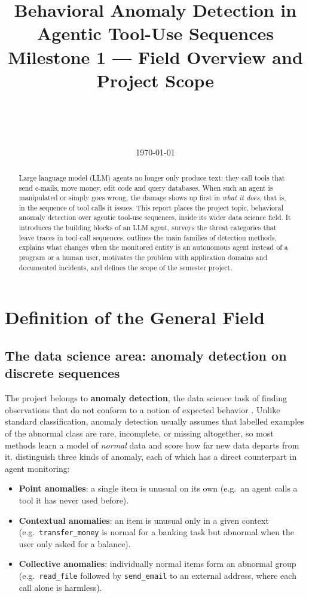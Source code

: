 \documentclass[11pt,a4paper]{article}
\title{\textbf{Behavioral Anomaly Detection in Agentic Tool-Use Sequences}\\[4pt]
\large Milestone 1 --- Field Overview and Project Scope}
\author{\studentname\\ \small \studentid\\ \small \supervisor\\ \small \course}
\date{\today}
\begin{document}
\maketitle

\begin{abstract}
\noindent Large language model (LLM) agents no longer only produce text: they call tools that send e-mails, move money, edit code and query databases. When such an agent is manipulated or simply goes wrong, the damage shows up first in \emph{what it does}, that is, in the sequence of tool calls it issues. This report places the project topic, behavioral anomaly detection over agentic tool-use sequences, inside its wider data science field. It introduces the building blocks of an LLM agent, surveys the threat categories that leave traces in tool-call sequences, outlines the main families of detection methods, explains what changes when the monitored entity is an autonomous agent instead of a program or a human user, motivates the problem with application domains and documented incidents, and defines the scope of the semester project.
\end{abstract}

\tableofcontents
\newpage

\section{Definition of the General Field}
\label{sec:field}

\subsection{The data science area: anomaly detection on discrete sequences}

The project belongs to \textbf{anomaly detection}, the data science task of finding observations that do not conform to a notion of expected behavior \citep{chandola2009anomaly}. Unlike standard classification, anomaly detection usually assumes that labelled examples of the abnormal class are rare, incomplete, or missing altogether, so most methods learn a model of \emph{normal} data and score how far new data departs from it. \citet{chandola2009anomaly} distinguish three kinds of anomaly, each of which has a direct counterpart in agent monitoring:
\begin{itemize}
  \item \textbf{Point anomalies}: a single item is unusual on its own (e.g.\ an agent calls a tool it has never used before).
  \item \textbf{Contextual anomalies}: an item is unusual only in a given context (e.g.\ \texttt{transfer\_money} is normal for a banking task but abnormal when the user only asked for a balance).
  \item \textbf{Collective anomalies}: individually normal items form an abnormal group (e.g.\ \texttt{read\_file} followed by \texttt{send\_email} to an external address, where each call alone is harmless).
\end{itemize}
\end{document}
